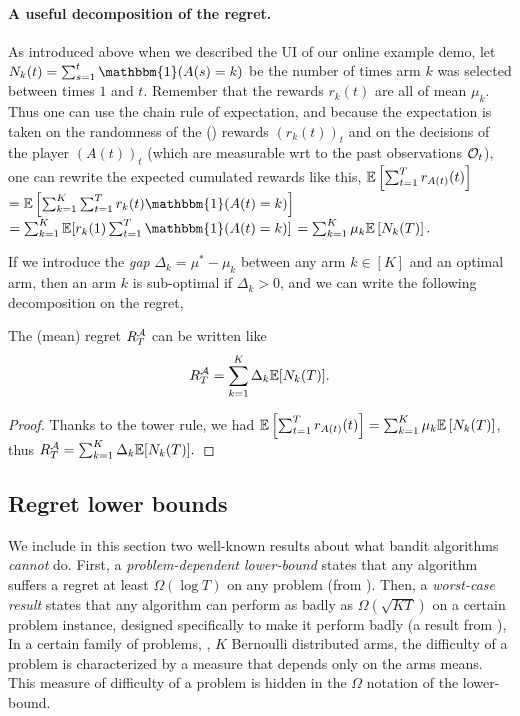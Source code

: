 \paragraph{A useful decomposition of the regret.}
%
As introduced above when we described the UI of our online example demo, let $N_k(t) = \sum_{s=1}^t \mathbbm{1}(A(s) = k)$ be the number of times arm $k$ was selected between times $1$ and $t$.
Remember that the rewards $r_k(t)$ are all \iid{} of mean $\mu_k$.
Thus one can use the chain rule of expectation, and because the expectation is taken on the randomness of the (\iid) rewards $(r_k(t))_t$ and on the decisions of the player $(A(t))_t$ (which are measurable wrt to the past observations $\mathcal{O}_t$),
one can rewrite the expected cumulated rewards like this,
$\mathbb{E} \left[ \sum_{t=1}^T r_{A(t)}(t) \right]$
$= \E \left[ \sum_{k=1}^K \sum_{t=1}^T r_k(t) \mathbbm{1}(A(t) = k) \right]$
$= \sum_{k=1}^K \E [ r_k(1) \sum_{t=1}^T \mathbbm{1}(A(t) = k) ]$
$= \sum_{k=1}^K \mu_k \mathbb{E} \left[ N_k(T) \right].$

If we introduce the \emph{gap} $\Delta_k = \mu^* - \mu_k$ between any arm $k\in[K]$ and an optimal arm,
then an arm $k$ is sub-optimal if $\Delta_k > 0$, and we can write the following decomposition on the regret,

\begin{lemma}\label{lem:2:RegretDecomposition}
    The (mean) regret $R_T^{\mathcal{A}}$ can be written like
    \begin{equation}
        R_T^{\mathcal{A}} = \sum_{k=1}^K \Delta_k \mathbb{E}[ N_k(T) ].
    \end{equation}
\end{lemma}
%
\begin{proof}\label{proof:2:RegretDecomposition}
    Thanks to the tower rule, we had
    $\mathbb{E} \left[ \sum_{t=1}^T r_{A(t)}(t) \right] = \sum_{k=1}^K \mu_k \mathbb{E} \left[ N_k(T) \right]$, thus $R_T^{\mathcal{A}} = \sum_{k=1}^K \Delta_k \mathbb{E}[ N_k(T) ].$
\end{proof}



\subsection{Regret lower bounds}

We include in this section two well-known results about what bandit algorithms \emph{cannot} do.
First, a \emph{problem-dependent lower-bound} states that any algorithm suffers a regret at least $\Omega(\log T)$ on any problem (from \cite{LaiRobbins85}).
Then, a \emph{worst-case result} states that any algorithm can perform as badly as $\Omega(\sqrt{K T})$ on a certain problem instance, designed specifically to make it perform badly (a result from \cite{Auer02NonStochastic}),
%
In a certain family of problems, \eg, $K$ Bernoulli distributed arms, the difficulty of a problem is characterized by a measure that depends only on the arms means. This measure of difficulty of a problem is hidden in the $\Omega$ notation of the lower-bound.

